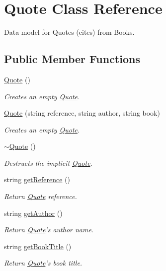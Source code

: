 \hypertarget{class_quote}{\section{Quote Class Reference}
\label{class_quote}
}


Data model for Quotes (cites) from Books.  


\subsection*{Public Member Functions}
\begin{DoxyCompactItemize}
\item 
\hyperlink{class_quote_ae160077e513fe6346eeba294a195038b}{Quote} ()
\begin{DoxyCompactList}\small\item\em Creates an empty \hyperlink{class_quote}{Quote}. \end{DoxyCompactList}\item 
\hyperlink{class_quote_a12fee26be3fcdf003691e394f256b2c8}{Quote} (string reference, string author, string book)
\begin{DoxyCompactList}\small\item\em Creates an empty \hyperlink{class_quote}{Quote}. \end{DoxyCompactList}\item 
\hyperlink{class_quote_a9b4324f3ee83827f2445177c8301482b}{$\sim$\-Quote} ()
\begin{DoxyCompactList}\small\item\em Destructs the implicit \hyperlink{class_quote}{Quote}. \end{DoxyCompactList}\item 
string \hyperlink{class_quote_ac397baacf75c95f29feb609ece9335f9}{get\-Reference} ()
\begin{DoxyCompactList}\small\item\em Return \hyperlink{class_quote}{Quote} reference. \end{DoxyCompactList}\item 
string \hyperlink{class_quote_a609abf6ab14773bafd6445f50b0cefba}{get\-Author} ()
\begin{DoxyCompactList}\small\item\em Return \hyperlink{class_quote}{Quote}'s author name. \end{DoxyCompactList}\item 
string \hyperlink{class_quote_ad571172e7027459ac118b2af4c5abd9e}{get\-Book\-Title} ()
\begin{DoxyCompactList}\small\item\em Return \hyperlink{class_quote}{Quote}'s book title. \end{DoxyCompactList}\item 

\end{DoxyCompactItemize}
